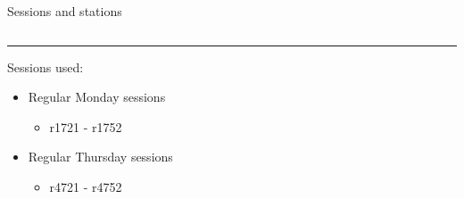 \documentclass{beamer}
\begin{document}
    \begin{frame}{Sessions and stations}
        \begin{columns}[T] %
            \begin{column}{.48\textwidth}
            \color{black}\rule{\linewidth}{4pt}

                Sessions used:

                \begin{itemize}
                    \item Regular Monday sessions
                    \begin{itemize}
                        \item r1721 - r1752 
                    \end{itemize}
                    \item Regular Thursday sessions
                    \begin{itemize}
                        \item r4721 - r4752 
                    \end{itemize}
                \end{itemize}


\end{column}
\end{columns}
\end{frame}
\end{document}
